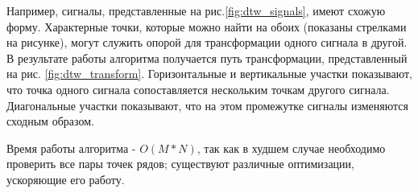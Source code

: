 Например, сигналы, представленные на рис.\ref{fig:dtw_signals}\cite{dtw_review}, имеют схожую форму. Характерные точки, которые можно найти на обоих (показаны стрелками на рисунке), могут служить опорой для трансформации одного сигнала в другой. В результате работы алгоритма получается путь трансформации, представленный на рис. \ref{fig:dtw_transform}\cite{dtw_review}. Горизонтальные и вертикальные участки показывают, что точка одного сигнала сопоставляется нескольким точкам другого сигнала. Диагональные участки показывают, что на этом промежутке сигналы изменяются сходным образом.



Время работы алгоритма - $O(M*N)$, так как в худшем случае необходимо проверить все пары точек рядов; существуют различные оптимизации, ускоряющие его работу.